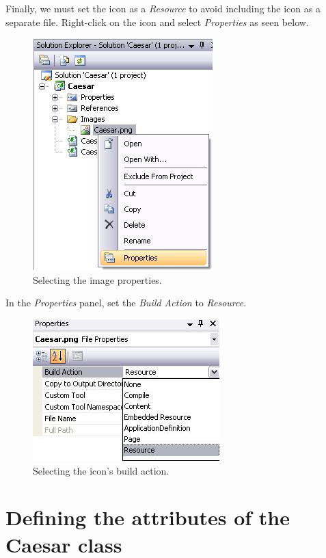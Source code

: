 Finally, we must set the icon as a \textit{Resource} to avoid including the icon as a separate file. Right-click on the icon and select \textit{Properties} as seen below.

\begin{figure}[h!]
	\centering
		\includegraphics{figures/icon_properties.jpg}
	\caption{Selecting the image properties.}
	\label{fig:icon_properties}
\end{figure}

In the \textit{Properties} panel, set the \textit{Build Action} to \textit{Resource}.

\begin{figure}[h!]
	\centering
		\includegraphics{figures/icon_build_action.jpg}
	\caption{Selecting the icon's build action.}
	\label{fig:icon_build_action}
\end{figure}
\clearpage

\section{Defining the attributes of the Caesar class}
\label{sec:DefiningTheAttributesOfTheCaesarClass}

